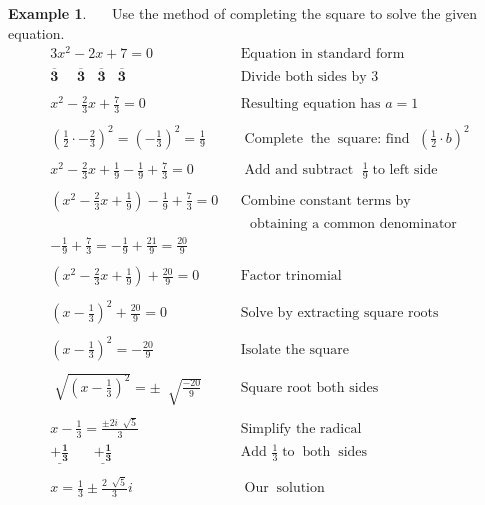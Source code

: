 \documentclass[12pt]{book}
\theoremstyle{definition}
\newtheorem{example}{Example}
\newcommand{\tmmathbf}[1]{\ensuremath{\boldsymbol{#1}}}
\newcommand{\tmop}[1]{\ensuremath{\operatorname{#1}}}
\begin{document}
\begin{example}~~~Use the method of completing the square to solve the given equation.
  \begin{eqnarray*}
    3 x^2 - 2 x + 7=0 &  & \tmop{Equation~in~standard~form}\\
    \tmmathbf{\overline{3} ~~~~~~ \overline{3} ~~~~ \overline{3} ~~~~\overline{3}}&  & \text{Divide~both~sides~by~} 3\\
    &  & \\
    x^2 - \frac{2}{3} x + \frac{7}{3}=0 &  & \text{Resulting~equation~has~} a=1\\
		&  & \\
    \left( \frac{1}{2} \cdot -\frac{2}{3} \right)^2 = \left( -\frac{1}{3}\right)^2 = \frac{1}{9} &&\tmop{Complete} \tmop{the} \tmop{square:~find~} \left(\frac{1}{2} \cdot b \right)^2\\
    &&\\
		x^2 - \frac{2}{3} x +\frac{1}{9}-\frac{1}{9}+ \frac{7}{3}=0&  & \tmop{Add~and~subtract~} \frac{1}{9} \tmop{to~left~side}\\
    &  & \\
    \left(x^2 - \frac{2}{3} x +\frac{1}{9}\right)-\frac{1}{9}+ \frac{7}{3}=0 && \text{Combine~constant~terms~by}\\
		&&~~~\text{obtaining~a~common~denominator}\\
		-\frac{1}{9}+ \frac{7}{3} = -\frac{1}{9} + \frac{21}{9}=\frac{20}{9} &  &\\
		&&\\
		\left(x^2 - \frac{2}{3} x +\frac{1}{9}\right)+\frac{20}{9}=0 & & \tmop{Factor~trinomial}\\
    &  & \\
    \left(x - \frac{1}{3}\right)^2+ \frac{20}{9}=0 &  & \tmop{Solve~by~extracting~square~roots}\\
    &  & \\
    \left( x - \frac{1}{3} \right)^2 = - \frac{20}{9} &  & \text{Isolate~the~square}\\
    &  & \\
    \sqrt[]{\left( x - \frac{1}{3} \right)^2} = \pm~ \sqrt[]{\frac{- 20}{9}} & 
    & \tmop{Square~root~both~sides}\\
    &  & \\
    x - \frac{1}{3} = \frac{\pm 2 i~ \sqrt[]{5}}{3} &  & \tmop{Simplify~the~radical}\\
		\tmmathbf{\underline{+ \frac{1}{3}}~~~~~~~~\underline{ + \frac{1}{3} }}  &  & \text{Add~} \frac{1}{3}
    \tmop{to} \tmop{both} \tmop{sides}\\
    &&\\
		x = \frac{1}{3} \pm \frac{2~\sqrt[]{5}}{3}i &  & \tmop{Our} \tmop{solution}
  \end{eqnarray*}
\end{example} 
\end{document}
